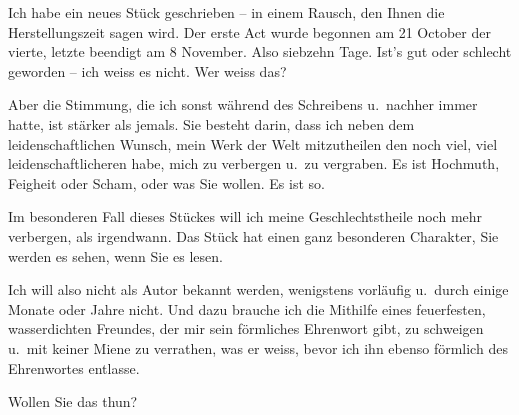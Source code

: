 \pstart
           Ich habe ein neues Stück
               geschrieben – in einem Rausch, den Ihnen die Herstellungszeit sagen wird. Der erste
               Act wurde begonnen am 21 October der vierte, letzte beendigt am 8 November. Also siebzehn Tage. Ist’s gut oder schlecht geworden – ich weiss
               es nicht. Wer weiss das?\pend
           
\pstart
           Aber die Stimmung, die ich sonst während des Schreibens u. nachher immer hatte, ist
               stärker als jemals. Sie besteht darin, dass ich neben dem leidenschaftlichen Wunsch,
               mein Werk der Welt
               mitzutheilen den noch viel, viel leidenschaftlicheren habe, mich zu verbergen u. zu
               vergraben. Es ist Hochmuth, Feigheit oder Scham, oder was Sie wollen. Es ist so.\pend
           
\pstart
           Im besonderen Fall dieses Stückes will ich meine Geschlechtstheile noch mehr verbergen, als
               irgendwann. Das Stück hat
               einen ganz besonderen Charakter, Sie werden es sehen, wenn Sie es lesen.\pend
           
\pstart
           Ich will also nicht als Autor bekannt werden, wenigstens vorläufig u. durch einige
               Monate oder Jahre nicht. Und dazu brauche ich die Mithilfe {\pb}eines feuerfesten, wasserdichten
               Freundes, der mir sein förmliches Ehrenwort gibt, zu schweigen u. mit keiner Miene zu
               verrathen, was er weiss, bevor ich ihn ebenso förmlich des Ehrenwortes entlasse.\pend
           
\pstart
           Wollen Sie das thun?\pend
           
